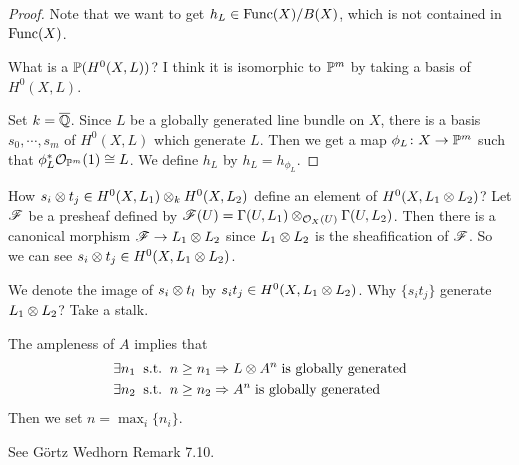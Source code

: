 \begin{proof}
Note that we want to get $h_L \in \Func(X)/B(X)$, which is not contained in  $\Func(X)$.

What is a $\P(H^0(X,L))$? I think it is isomorphic to $\P^m$ by taking a basis of $H^0(X,L)$.

  Set $k = \ol{\Q}$. Since $L$ be a globally generated line bundle on $X$, there is a basis $s_0, \cdots , s_m$ of $H^0(X,L)$ which generate $L$. Then we get a map $\phi_L \colon X \to \P^m$ such that $\phi_L^* \calo_{\P^m}(1) \cong L$. We define $h_L$ by $h_L = h_{\phi_L}$.
\end{proof}


\begin{rem}
  How $s_i \ts t_j \in H^0(X,L_1) \ts_k H^0(X,L_2)$ define an element of $H^0(X,L_1 \ts L_2)$? Let $\scrf$ be a presheaf defined by $\scrf(U) = \grG(U,L_1) \ts_{\calo_{X}(U)} \grG(U,L_2)$. Then there is a canonical morphism $\scrf \to L_1 \ts L_2$ since $L_1 \ts L_2$ is the sheafification of $\scrf$.
  So we can see $s_i \ts t_j \in H^0(X,L_1 \ts L_2)$.

  We denote the image of $s_i \ts t_l$ by $s_it_j \in H^0(X,L_1 \ts L_2)$. Why $\{ s_it_j \}$ generate $L_1 \ts L_2$? Take a stalk.
\end{rem}


\begin{rem}
  The ampleness of $A$ implies that
  \begin{align*}
    \exists n_1 \st n \geq n_1 &\To L \ts A^n \; \text{is globally generated} \\
      \exists n_2 \st n \geq n_2 &\To  A^n \; \text{is globally generated}
  \end{align*}
  Then we set $n = \max_i \{ n_i\}$.
\end{rem}


\begin{rem}
  See G\"ortz Wedhorn\cite{GW} Remark 7.10.
\end{rem}


